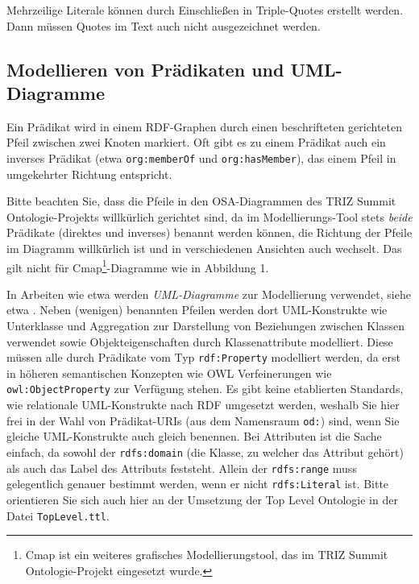 \documentclass[11pt,a4paper]{article}
\begin{document}
Mehrzeilige Literale können durch Einschließen in Triple-Quotes erstellt
werden. Dann müssen Quotes im Text auch nicht ausgezeichnet werden.

\subsection{Modellieren von Prädikaten und UML-Diagramme}

Ein Prädikat wird in einem RDF-Graphen durch einen beschrifteten gerichteten
Pfeil zwischen zwei Knoten markiert.   Oft gibt es zu einem Prädikat auch ein
inverses Prädikat (etwa \texttt{org:memberOf} und \texttt{org:hasMember}), das
einem Pfeil in umgekehrter Richtung entspricht.

Bitte beachten Sie, dass die Pfeile in den OSA-Diagrammen des TRIZ Summit
Ontologie-Projekts willkürlich gerichtet sind, da im Modellierungs-Tool stets
\emph{beide} Prädikate (direktes und inverses) benannt werden können, die
Richtung der Pfeile im Diagramm willkürlich ist und in verschiedenen Ansichten
auch wechselt.  Das gilt nicht für Cmap\footnote{Cmap ist ein weiteres
  grafisches Modellierungstool, das im TRIZ Summit Ontologie-Projekt
  eingesetzt wurde.}-Diagramme wie in Abbildung 1.

In Arbeiten wie etwa \cite{IDM2011} werden \emph{UML-Diagramme} zur
Modellierung verwendet, siehe etwa \cite[Fig. 2]{IDM2011}. Neben (wenigen)
benannten Pfeilen werden dort UML-Konstrukte wie Unterklasse und Aggregation
zur Darstellung von Beziehungen zwischen Klassen verwendet sowie
Objekteigenschaften durch Klassenattribute modelliert.  Diese müssen alle
durch Prädikate vom Typ \texttt{rdf:Property} \cite{RDFS} modelliert werden,
da erst in höheren semantischen Konzepten wie OWL \cite{OWL} Verfeinerungen
wie \texttt{owl:ObjectProperty} zur Verfügung stehen.  Es gibt keine
etablierten Standards, wie relationale UML-Konstrukte nach RDF umgesetzt
werden, weshalb Sie hier frei in der Wahl von Prädikat-URIs (aus dem
Namensraum \texttt{od:}) sind, wenn Sie gleiche UML-Konstrukte auch gleich
benennen.  Bei Attributen ist die Sache einfach, da sowohl der
\texttt{rdfs:domain} (die Klasse, zu welcher das Attribut gehört) als auch das
Label des Attributs feststeht.  Allein der \texttt{rdfs:range} muss
gelegentlich genauer bestimmt werden, wenn er nicht \texttt{rdfs:Literal} ist.
Bitte orientieren Sie sich auch hier an der Umsetzung der Top Level Ontologie
in der Datei \texttt{TopLevel.ttl}.
\end{document}
